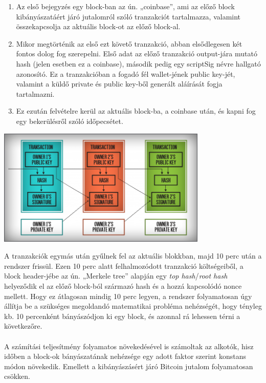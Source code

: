 \documentclass[11pt,a4paper]{article}
\newcommand{\q}[1]{„#1''} %
\begin{document}
\begin{enumerate}
    \item Az első bejegyzés egy block-ban az ún. \q{coinbase}, ami az előző block kibányászatáért járó jutalomról szóló tranzakciót tartalmazza, valamint összekapcsolja az aktuális block-ot az előző block-al.
    \item Mikor megtörténik az első ezt követő tranzakció, abban elsődlegesen két fontos dolog fog szerepelni. Első adat az előző tranzakció output-jára mutató hash (jelen esetben ez a coinbase), második pedig egy scriptSig névre hallgató azonosító. Ez a tranzakcióban a fogadó fél wallet-jének public key-jét, valamint a küldő private és public key-ből generált aláírását fogja tartalmazni.
    \item Ez ezután felvételre kerül az aktuális block-ba, a coinbase után, és kapni fog egy bekerülésről szóló időpecsétet.
\end{enumerate}

\begin{center}
\includegraphics[width=0.75\textwidth]{transactions.png}
\end{center}

\noindent A tranzakciók egymás után gyűlnek fel az aktuális blokkban, majd 10 perc után a rendszer frissül. Ezen 10 perc alatt felhalmozódott tranzakció költségeiből, a block header-jébe az ún. \q{Merkele tree} alapján egy \textit{top hash}/\textit{root hash} helyeződik el az előző block-ból származó hash és a hozzá kapcsolódó nonce mellett. Hogy ez átlagosan mindig 10 perc legyen, a rendszer folyamatosan úgy állítja be a szükséges megoldandó matematikai probléma nehézségét, hogy tényleg kb. 10 percenként bányászódjon ki egy block, és azonnal rá lehessen térni a következőre.
\\ \\
A számítási teljesítmény folyamatos növekedésével is számoltak az alkotók, hisz időben a block-ok bányászatának nehézsége egy adott faktor szerint konstans módon növekedik. Emellett a kibányászásért járó Bitcoin jutalom folyamatosan csökken.
\end{document}
